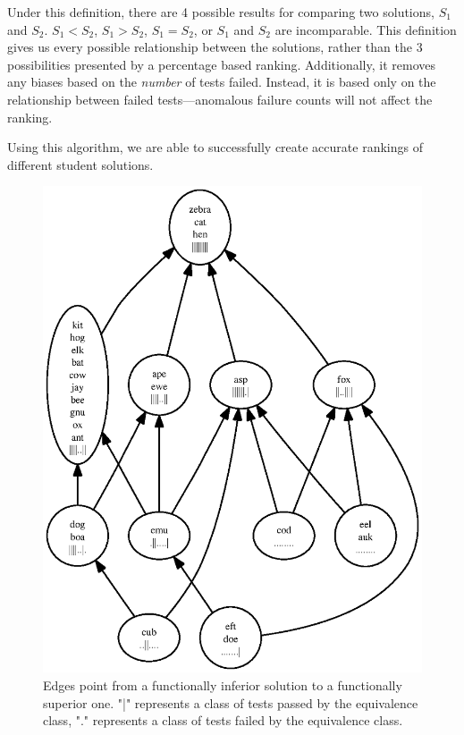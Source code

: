 \documentclass[11pt]{article}
\begin{document}
Under this definition, there are 4 possible results for comparing two solutions, $S_1$ and $S_2$. $S_1 < S_2$, $S_1 > S_2$, $S_1 = S_2$, or $S_1$ and $S_2$  are incomparable. This definition gives us every possible relationship between the solutions, rather than the 3 possibilities presented by a percentage based ranking. Additionally, it removes any biases based on the \emph{number} of tests failed. Instead, it is based only on the relationship between failed tests---anomalous failure counts will not affect the ranking.

Using this algorithm, we are able to successfully create accurate rankings of different student solutions.

\begin{figure}
\centering
\includegraphics{rank1.ps}
\caption{Edges point from a functionally inferior solution to a functionally superior one. "|" represents a class of tests passed by the equivalence class, "." represents a class of tests failed by the equivalence class.}
\end{figure}
\end{document}
